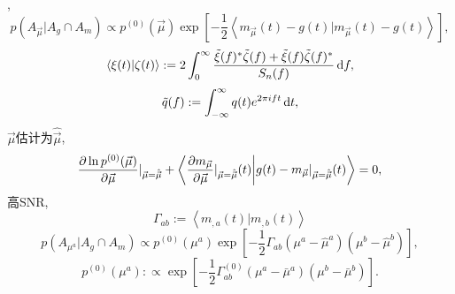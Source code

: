 \cite{Poisson1995}, 
\begin{equation}
    p({A_{\vec{\mu}}}|A_g\cap A_m)\propto p^{(0)}(\vec{\mu})\exp[
        -\frac{1}{2}\left\langle 
            m_{\vec{\mu}}(t)-g(t)|m_{\vec{\mu}}(t)-g(t)
        \right\rangle 
    ],
\end{equation}
\begin{equation}
    \left\langle \xi(t)|\zeta(t)\right\rangle:=2\int_0^\infty\frac{\tilde{\xi}(f)^*\tilde{\zeta}(f)+\tilde{\xi}(f)\tilde{\zeta}(f)^*}{S_n(f)}\,\mathrm{d} f,
\end{equation}
\begin{equation}
    \tilde{q}(f):=\int_{-\infty}^{\infty}q(t)e^{2\pi ift}\,\mathrm{d} t,
\end{equation}
$\vec{\mu}$估计为$\hat{\vec{\mu}}$,
\begin{equation}
    \frac{\partial\ln p^{(0)}(\vec{\mu})}{\partial \vec{\mu}}|_{\vec{\mu}=\hat{\vec{\mu}}}+\left\langle \frac{\partial m_{\vec{\mu}}}{\partial \vec{\mu}}|_{\vec{\mu}=\hat{\vec{\mu}}}(t)\bigg|g(t)-m_{\vec{\mu}}|_{\vec{\mu}=\hat{\vec{\mu}}}(t)\right\rangle=0,
\end{equation}
高SNR, 
\begin{equation}
    \Gamma_{ab}:=\left\langle m_{,a}(t)|m_{,b}(t)\right\rangle
\end{equation}
\begin{equation}
    p({A_{\mu^a}}|A_g\cap A_m)\propto p^{(0)}({\mu^a})\exp[
        -\frac{1}{2}\Gamma_{ab}(\mu^a-\hat{\mu}^a)(\mu^b-\hat{\mu}^b)
    ],
\end{equation}
\begin{equation}
    p^{(0)}({\mu^a}):\propto\exp[
        -\frac{1}{2}\Gamma^{(0)}_{ab}(\mu^a-\bar{\mu}^a)(\mu^b-\bar{\mu}^b)
    ].
\end{equation}
